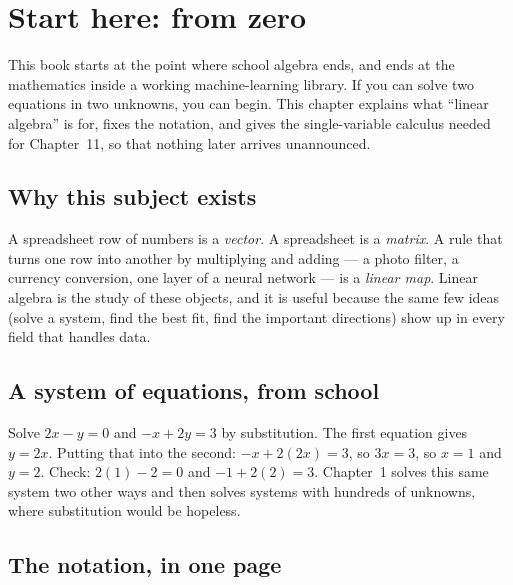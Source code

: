 \chapter*{Start here: from zero}

This book starts at the point where school algebra ends, and ends at the
mathematics inside a working machine-learning library. If you can solve two
equations in two unknowns, you can begin. This chapter explains what ``linear
algebra'' is for, fixes the notation, and gives the single-variable calculus
needed for Chapter~11, so that nothing later arrives unannounced.

\section*{Why this subject exists}

A spreadsheet row of numbers is a \emph{vector}. A spreadsheet is a \emph{matrix}.
A rule that turns one row into another by multiplying and adding --- a
photo filter, a currency conversion, one layer of a neural network --- is a
\emph{linear map}. Linear algebra is the study of these objects, and it is useful
because the same few ideas (solve a system, find the best fit, find the
important directions) show up in every field that handles data.

\section*{A system of equations, from school}

Solve $2x - y = 0$ and $-x + 2y = 3$ by substitution. The first equation gives
$y=2x$. Putting that into the second: $-x+2(2x)=3$, so $3x=3$, so $x=1$ and $y=2$.
Check: $2(1)-2=0$ and $-1+2(2)=3$. Chapter~1 solves this same system two other
ways and then solves systems with hundreds of unknowns, where substitution would
be hopeless.

\section*{The notation, in one page}

